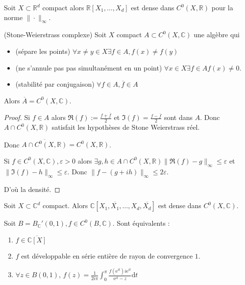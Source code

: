 \begin{corollaire}
	Soit $X\subset \mathbb{R}^d $ compact alors $\mathbb{R}[X_1,\ldots,X_d]$ est dense dans $C^0\left(X,\mathbb{R}\right)  $ pour la norme $\|\cdot \|_\infty$.
\end{corollaire}

\begin{corollaire}
	(Stone-Weierstrass complexe)
	Soit $X$ compact $A \subset C^0\left(X,\mathbb{C} \right)  $ une algèbre qui 
	\begin{itemize}
		\item (sépare les points) $\forall x \neq y \in X \exists f \in A, f(x) \neq f(y)$
		\item (ne s'annule pas pas simultanément en un point) $\forall x \in X \exists f \in A f\left( x \right) \neq 0$.
		\item (stabilité par conjugaison) $\forall f \in A, \overline{f} \in A $
	\end{itemize}
	Alors $\overline{A} = C^0\left(X,\mathbb{C} \right)  $.
\end{corollaire}

\begin{proof}
	Si $f \in A$ alors $\Re\left( f \right) := \frac{f+\overline{f}}{2}$ et $\Im \left( f \right) = \frac{f-\overline{f}}{2}$ sont dans $A$. Donc $A \cap C^0\left(X,\mathbb{R}\right)  $ satisfait les hypothèses de Stone Weierstrass réel. 

	Donc $\overline{A \cap C^0\left(X,\mathbb{R}\right)  } = C^0\left(X,\mathbb{R}\right)  $.

	Si $f \in C^0\left(X,\mathbb{C} \right), \varepsilon>0 $ alors $\exists  g,h \in A \cap  C^0\left(X,\mathbb{R}\right) \| \Re\left( f \right) -g\|_\infty\le \varepsilon $ et $\| \Im\left( f \right) - h\|_{\infty}\le \varepsilon$. Donc $\|f - (g+ih)\|_\infty\le 2 \varepsilon.$

	D'où la densité.
\end{proof}

\begin{corollaire}
	Soit $X \subset \mathbb{C} ^d$ compact.
	Alors $\mathbb{C} [X_1, \overline{X_1},\ldots, X_d, \overline{X_d}]$ est dense dans $C^0\left(X,\mathbb{C} \right)  $.
\end{corollaire}
\begin{remarque}
	Soit $B = B_{\mathbb{C} }'\left( 0,1 \right), f \in C^0\left(B,\mathbb{C} \right)  $.
	Sont équivalents : 
	\begin{enumerate}
		\item $f \in \overline{\mathbb{C} [X]}$
		\item $f$ est développable en série entière de rayon de convergence $1$.
		\item $\forall z \in B\left( 0,1 \right) $, $f\left( z \right) = \frac{1}{2i  \pi}\int_{0}^{\pi} \frac{f\left( \text{e}^{it} \right)  i\text{e}^{it}}{\text{e}^{it} -z} \mathrm{d} t$
	\end{enumerate}
\end{remarque}

